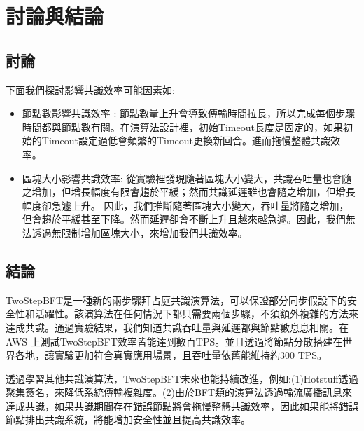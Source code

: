 \chapter{討論與結論}\label{se_8}
\section{討論}\label{se_8} 
下面我們探討影響共識效率可能因素如:

\begin{itemize}%

\item 節點數影響共識效率 :
節點數量上升會導致傳輸時間拉長，所以完成每個步驟時間都與節點數有關。在演算法設計裡，初始Timeout長度是固定的，如果初始的Timeout設定過低會頻繁的Timeout更換新回合。進而拖慢整體共識效率。

\item 區塊大小影響共識效率:
從實驗裡發現隨著區塊大小變大，共識吞吐量也會隨之增加，但增長幅度有限會趨於平緩；然而共識延遲雖也會隨之增加，但增長幅度卻急遽上升。
因此，我們推斷隨著區塊大小變大，吞吐量將隨之增加，但會趨於平緩甚至下降。然而延遲卻會不斷上升且越來越急遽。因此，我們無法透過無限制增加區塊大小，來增加我們共識效率。


\end{itemize}

\section{結論}\label{se_8}
TwoStepBFT是一種新的兩步驟拜占庭共識演算法，可以保證部分同步假設下的安全性和活躍性。該演算法在任何情況下都只需要兩個步驟，不須額外複雜的方法來達成共識。通過實驗結果，我們知道共識吞吐量與延遲都與節點數息息相關。在AWS 上測試TwoStepBFT效率皆能達到數百TPS。並且透過將節點分散搭建在世界各地，讓實驗更加符合真實應用場景，且吞吐量依舊能維持約300 TPS。

透過學習其他共識演算法，TwoStepBFT未來也能持續改進，例如:(1)Hotstuff透過聚集簽名，來降低系統傳輸複雜度。(2)由於BFT類的演算法透過輪流廣播訊息來達成共識，如果共識期間存在錯誤節點將會拖慢整體共識效率，因此如果能將錯誤節點排出共識系統，將能增加安全性並且提高共識效率。

